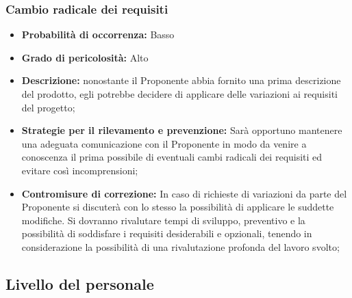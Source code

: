 \subsubsection{Cambio radicale dei requisiti}
\hypertarget{subsubsect:requisiti}{}
\begin{itemize}
\item \textbf{Probabilità di occorrenza:} Basso
\item \textbf{Grado di pericolosità:} Alto
\item \textbf{Descrizione:} nonostante il Proponente abbia fornito una prima descrizione del prodotto, egli potrebbe decidere di applicare delle variazioni ai requisiti del progetto;
\item \textbf{Strategie per il rilevamento e prevenzione:} Sarà opportuno mantenere una adeguata comunicazione con il Proponente in modo da venire a conoscenza il prima possibile di eventuali cambi radicali dei requisiti ed evitare così incomprensioni;
\item \textbf{Contromisure di correzione:} In caso di richieste di variazioni da parte del Proponente si discuterà con lo stesso la possibilità di applicare le suddette modifiche. Si dovranno rivalutare tempi di sviluppo, preventivo e la possibilità di soddisfare i requisiti desiderabili e opzionali, tenendo in considerazione la possibilità di una rivalutazione profonda del lavoro svolto;
\end{itemize}

\subsection{Livello del personale}

